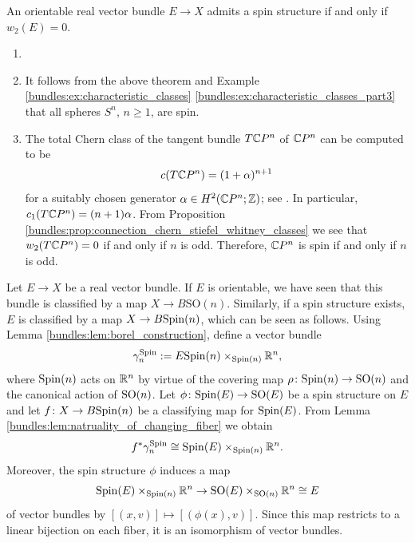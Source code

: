 \begin{theorem}
    \label{bundles:thm:spin_iff_w2_vanishes}
    An orientable real vector bundle $E \to X$ admits a spin structure if and only if $w_2(E) = 0$. 
\end{theorem}

\begin{example}
    \label{bundles:ex:spin_and_non_spin}
    \begin{enumerate}[label=(\roman*)]
        \item[]
        \item \vspace{-.5em} It follows from the above theorem and Example \ref{bundles:ex:characteristic_classes} \ref{bundles:ex:characteristic_classes_part3} that all spheres $S^n$, $n\geq 1$, are spin.
        \item \label{bundles:ex:cp2_not_spin} The total Chern class of the tangent bundle $T\mathbb{C} P^n$ of $\mathbb{C} P^n$ can be computed to be 
        \[
        c(T\mathbb{C} P^n) = (1 + \alpha)^{n+1}
        \]
        for a suitably chosen generator $\alpha \in H^2(\mathbb{C} P^n;\mathbb{Z})$; see \cite[Thm. 14.10]{MilnorStasheff1974}. In particular, $c_1(T\mathbb{C} P^n) = (n+1) \alpha$. From Proposition \ref{bundles:prop:connection_chern_stiefel_whitney_classes} we see that $w_2(T\mathbb{C} P^n) = 0$ if and only if $n$ is odd. Therefore, $\mathbb{C} P^n$ is spin if and only if $n$ is odd.
    \end{enumerate}
\end{example}

\begin{remark}
    \label{bundles:rem:classifying_map_for_spin_bundles}
    Let $E \to X$ be a real vector bundle. If $E$ is orientable, we have seen that this bundle is classified by a map $X \to B\mathrm{SO}(n)$. Similarly, if a spin structure exists, $E$ is classified by a map $X \to B\mathrm{Spin}(n)$, which can be seen as follows. Using Lemma \ref{bundles:lem:borel_construction}, define a vector bundle 
    \[
    \gamma_n^{\mathrm{Spin}} := E\mathrm{Spin}(n) \times_{\mathrm{Spin}(n)} \mathbb{R}^n,
    \]
    where $\mathrm{Spin}(n)$ acts on $\mathbb{R}^n$ by virtue of the covering map $\rho \colon \mathrm{Spin}(n) \to \mathrm{SO}(n)$ and the canonical action of $\mathrm{SO}(n)$. Let $\phi \colon \mathrm{Spin}(E) \to \mathrm{SO}(E)$ be a spin structure on $E$ and let $f \colon X \to B\mathrm{Spin}(n)$ be a classifying map for $\mathrm{Spin}(E)$. From Lemma \ref{bundles:lem:natruality_of_changing_fiber} we obtain
    \[
    f^\ast \gamma_n^{\mathrm{Spin}} \cong \mathrm{Spin}(E) \times_{\mathrm{Spin}(n)} \mathbb{R}^n.
    \]
    Moreover, the spin structure $\phi$ induces a map
    \[
    \mathrm{Spin}(E) \times_{\mathrm{Spin}(n)} \mathbb{R}^n \to \mathrm{SO}(E) \times_{\mathrm{SO}(n)} \mathbb{R}^n \cong E
    \] 
    of vector bundles by
    $
    [(x,v)] \mapsto [(\phi(x),v)].
    $
    Since this map restricts to a linear bijection on each fiber, it is an isomorphism of vector bundles. 
\end{remark}

